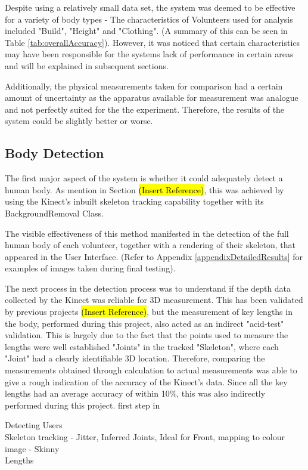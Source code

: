 Despite using a relatively small data set, the system was deemed to be effective for a variety of body types - The characteristics of Volunteers used for analysis included "Build", "Height" and "Clothing". (A summary of this can be seen in Table \ref{tab:overallAccuracy}). However, it was noticed that certain characteristics may have been responsible for the systems lack of performance in certain areas and will be explained in subsequent sections.

Additionally, the physical measurements taken for comparison had a certain amount of uncertainty as the apparatus available for measurement was analogue and not perfectly suited for the the experiment. Therefore, the results of the system could be slightly better or worse. 

\subsection{Body Detection}
The first major aspect of the system is whether it could adequately detect a human body. As mention in Section \hl{(Insert Reference)}, this was achieved by using the Kinect's inbuilt skeleton tracking capability together with its BackgroundRemoval Class.

The visible effectiveness of this method manifested in the detection of the full human body of each volunteer, together with a rendering of their skeleton, that appeared in the User Interface. (Refer to Appendix \ref{appendixDetailedResults} for examples of images taken during final testing). 

The next process in the detection process was to understand if the depth data collected by the Kinect was reliable for 3D measurement. This has been validated by previous projects \hl{(Insert Reference)}, but the measurement of key lengths in the body, performed during this project, also acted as an indirect "acid-test" validation. This is largely due to the fact that the points used to measure the lengths were well established "Joints" in the tracked "Skeleton", where each "Joint" had a clearly identifiable 3D location. Therefore, comparing the measurements obtained through calculation to actual measurements was able to give a rough indication of the accuracy of the Kinect's data. Since all the key lengths had an average accuracy of within 10\%, this was also indirectly performed during this project.  first step in 

Detecting Users\\
Skeleton tracking - Jitter, Inferred Joints, Ideal for Front, mapping to colour image - Skinny\\
Lengths\\


